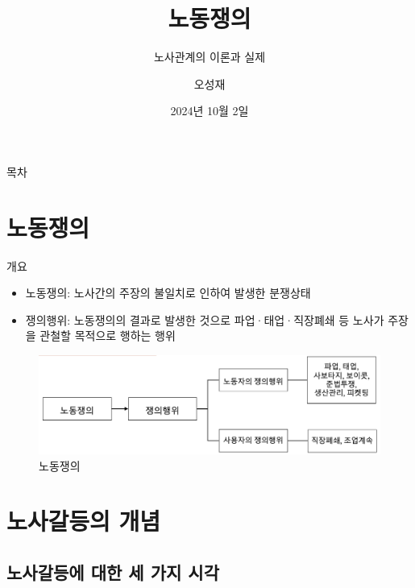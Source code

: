 \documentclass[aspectratio=169,xcolor=dvipsnames,handout]{beamer}
\title{노동쟁의}
\subtitle{노사관계의 이론과 실제}
\author{오성재}
\institute[CNU]
{\relax
    충남대학교 경제학과\\
}
\date{2024년 10월 2일}
\begin{document}

\frame{\titlepage}

\begin{frame}{목차}
    \small
    \tableofcontents[hideallsubsections]
\end{frame}

\section{노동쟁의}

\begin{frame}{개요}
    \begin{itemize}[<+->]
        \item 노동쟁의: 노사간의 주장의 불일치로 인하여 발생한 분쟁상태
        \item 쟁의행위: 노동쟁의의 결과로 발생한 것으로 파업·태업·직장폐쇄 등 노사가 주장을 관철할 목적으로 행하는 행위
    \end{itemize}
    \centering
    \begin{figure}
        \includegraphics[width=.8\textwidth]{pic/노동쟁의도식.png}
        \caption{노동쟁의}
    \end{figure}
\end{frame}

\section{노사갈등의 개념}
\subsection{노사갈등에 대한 세 가지 시각}
\end{document}
